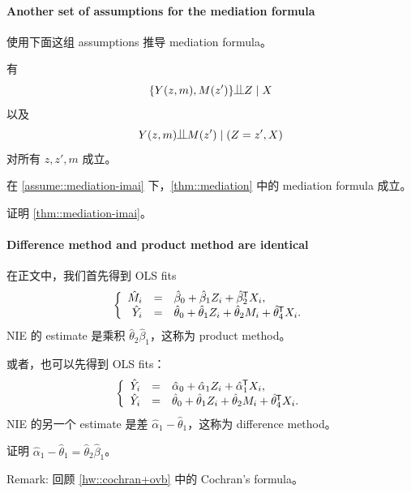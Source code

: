  \paragraph{Another set of assumptions for the mediation formula}\label{para::alternative-si}



\citet{Imai::2010} 使用下面这组 assumptions 推导 mediation formula。

\begin{assumption}
\label{assume::mediation-imai}
有
$$
\{Y(z, m), M(z') \} \ind  Z\mid X
$$
以及
$$
Y(z, m) \ind M(z' ) \mid (Z=z' , X)
$$
对所有 $z,z',m$ 成立。
\end{assumption}


\begin{theorem}
\label{thm::mediation-imai}
在 \cref{assume::mediation-imai} 下，\cref{thm::mediation} 中的 mediation formula 成立。
\end{theorem}


证明 \cref{thm::mediation-imai}。



\paragraph{Difference method and product method are identical}\label{hw::difference=product}


在正文中，我们首先得到 OLS fits
$$
\left\{\begin{array}{rcl}
\hat M_i &=&  \hat\beta_0 + \hat\beta_1 Z_i + \hat\beta_2^{\mkern-1.5mu\mathsf{T}} X_i, \\
\hat Y_i &=&\hat \theta_0 + \hat\theta_1 Z_i +\hat \theta_2 M_i + \hat\theta_4^{\mkern-1.5mu\mathsf{T}} X_i.
\end{array}\right.
$$
NIE 的 estimate 是乘积 $\hat\theta_2\hat\beta_1$，这称为 product method。

或者，也可以先得到 OLS fits：
$$
\left\{\begin{array}{rcl}
\hat Y_i &=&  \hat\alpha_0 + \hat\alpha_1 Z_i + \hat\alpha_1 ^{\mkern-1.5mu\mathsf{T}} X_i, \\
\hat Y_i &=&\hat \theta_0 + \hat\theta_1 Z_i +\hat \theta_2 M_i + \hat\theta_4^{\mkern-1.5mu\mathsf{T}} X_i.
\end{array}\right.
$$
NIE 的另一个 estimate 是差 $\hat\alpha_1-\hat\theta_1$，这称为 difference method。

证明 $\hat\alpha_1-\hat\theta_1=\hat\theta_2\hat\beta_1$。


Remark: 回顾 \cref{hw::cochran+ovb} 中的 Cochran's formula。



